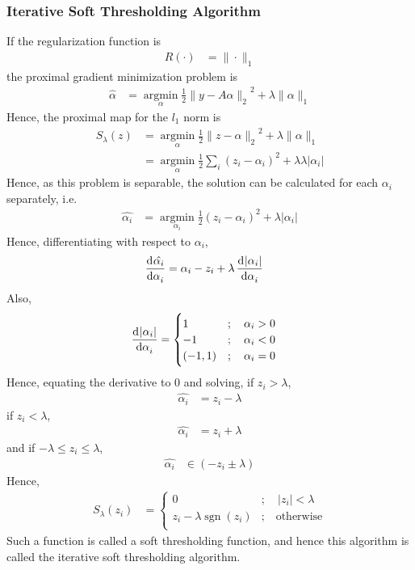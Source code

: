 \documentclass[titlepage, fleqn, a4paper, 12pt, twoside]{article}
\theoremstyle{definition}
\theoremstyle{theorem}
\DeclareMathOperator{\argmin}{\mathrm{argmin}}
\DeclareMathOperator{\sgn}{\mathrm{sgn}}
\begin{document}
\subsubsection{Iterative Soft Thresholding Algorithm}

If the regularization function is
\begin{align*}
	R(\cdot) &= \|\cdot\|_1
\end{align*}
the proximal gradient minimization problem is
\begin{align*}
	\hat{\alpha} &= \argmin\limits_{\alpha} \frac{1}{2} {\|y - A \alpha\|_2}^2 + \lambda \|\alpha\|_1
\end{align*}
Hence, the proximal map for the $l_1$ norm is
\begin{align*}
	S_{\lambda}(z) &= \argmin\limits_{\alpha} \frac{1}{2} {\|z - \alpha\|_2}^2 + \lambda \|\alpha\|_1\\
	&= \argmin\limits_{\alpha} \frac{1}{2} \sum\limits_{i} (z_i - \alpha_i)^2 + \lambda \lambda |\alpha_i|
\end{align*}
Hence, as this problem is separable, the solution can be calculated for each $\alpha_i$ separately, i.e.
\begin{align*}
	\hat{\alpha_i} &= \argmin\limits_{\alpha_i} \frac{1}{2} (z_i - \alpha_i)^2 + \lambda |\alpha_i|
\end{align*}
Hence, differentiating with respect to $\alpha_i$,
\begin{align*}
	\dod{\hat{\alpha_i}}{\alpha_i} &= \alpha_i - z_i + \lambda \dod{|\alpha_i|}{\alpha_i}
\end{align*}
Also,
\begin{align*}
	\dod{|\alpha_i|}{\alpha_i} &=
		\begin{cases}
			1 &;\quad \alpha_i > 0\\
			-1 &;\quad \alpha_i < 0\\
			(-1,1) &;\quad \alpha_i = 0\\
		\end{cases}
\end{align*}
Hence, equating the derivative to $0$ and solving, if $z_i > \lambda$,
\begin{align*}
	\hat{\alpha_i} &= z_i - \lambda
\end{align*}
if $z_i < \lambda$,
\begin{align*}
	\hat{\alpha_i} &= z_i + \lambda
\end{align*}
and if $-\lambda \le z_i \le \lambda$,
\begin{align*}
	\hat{\alpha_i} &\in \left( -z_i \pm \lambda \right)
\end{align*}
Hence,
\begin{align*}
	S_{\lambda}(z_i) &=
		\begin{cases}
			0 &;\quad |z_i| < \lambda\\
			z_i - \lambda \sgn(z_i) &;\quad \text{otherwise}\\
		\end{cases}
\end{align*}
Such a function is called a soft thresholding function, and hence this algorithm is called the iterative soft thresholding algorithm.
\end{document}
